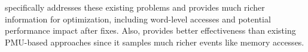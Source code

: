 \cheetah{} specifically addresses these existing problems
and provides much richer information for optimization, including word-level accesses and potential performance impact after fixes. Also, \Cheetah{} provides better effectiveness than existing PMU-based approaches since it samples much richer events like memory accesses. 






